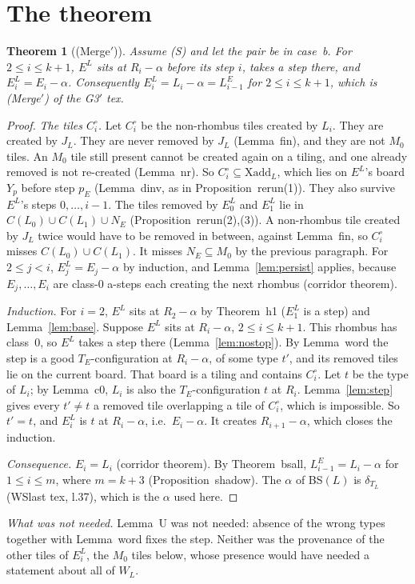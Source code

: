 \documentclass[11pt]{article}
\newtheorem{theorem}{Theorem}\newtheorem{lemma}[theorem]{Lemma}\newtheorem{proposition}[theorem]{Proposition}
\begin{document}
\section{The theorem}
\begin{theorem}[(Merge$'$)]\label{thm:mp}
Assume (S) and let the pair be in case~b. For $2\le i\le k+1$, $E^L$ sits at $R_i-\alpha$ before its step $i$, takes a step there, and $E^L_i=E_i-\alpha$. Consequently $E^L_i=L_i-\alpha=L^E_{i-1}$ for $2\le i\le k+1$, which is (Merge$'$) of the G3$'$ tex.
\end{theorem}
\begin{proof}
\emph{The tiles $C^\circ_i$.} Let $C^\circ_i$ be the non-rhombus tiles created by $L_i$. They are created by $J_L$. They are never removed by $J_L$ (Lemma~fin), and they are not $M_0$ tiles. An $M_0$ tile still present cannot be created again on a tiling, and one already removed is not re-created (Lemma~nr). So $C^\circ_i\subseteq\mathrm{Xadd}_L$, which lies on $E^L$'s board $Y_p$ before step $p_E$ (Lemma~dinv, as in Proposition~rerun(1)).
They also survive $E^L$'s steps $0,\dots,i-1$. The tiles removed by $E^L_0$ and $E^L_1$ lie in $C(L_0)\cup C(L_1)\cup N_E$ (Proposition~rerun(2),(3)). A non-rhombus tile created by $J_L$ twice would have to be removed in between, against Lemma~fin, so $C^\circ_i$ misses $C(L_0)\cup C(L_1)$. It misses $N_E\subseteq M_0$ by the previous paragraph. For $2\le j<i$, $E^L_j=E_j-\alpha$ by induction, and Lemma~\ref{lem:persist} applies, because $E_j,\dots,E_i$ are class-0 a-steps each creating the next rhombus (corridor theorem).

\emph{Induction.} For $i=2$, $E^L$ sits at $R_2-\alpha$ by Theorem~h1 ($E^L_1$ is a step) and Lemma~\ref{lem:base}. Suppose $E^L$ sits at $R_i-\alpha$, $2\le i\le k+1$. This rhombus has class~0, so $E^L$ takes a step there (Lemma~\ref{lem:nostop}). By Lemma~word the step is a good $T_E$-configuration at $R_i-\alpha$, of some type $t'$, and its removed tiles lie on the current board. That board is a tiling and contains $C^\circ_i$. Let $t$ be the type of $L_i$; by Lemma~c0, $L_i$ is also the $T_E$-configuration $t$ at $R_i$. Lemma~\ref{lem:step} gives every $t'\neq t$ a removed tile overlapping a tile of $C^\circ_i$, which is impossible. So $t'=t$, and $E^L_i$ is $t$ at $R_i-\alpha$, i.e.\ $E_i-\alpha$. It creates $R_{i+1}-\alpha$, which closes the induction.

\emph{Consequence.} $E_i=L_i$ (corridor theorem). By Theorem~bsall, $L^E_{i-1}=L_i-\alpha$ for $1\le i\le m$, where $m=k+3$ (Proposition~shadow). The $\alpha$ of BS$(L)$ is $\delta_{T_L}$ (WSlast tex, l.37), which is the $\alpha$ used here.
\end{proof}
\noindent\emph{What was not needed.} Lemma~U was not needed: absence of the wrong types together with Lemma~word fixes the step. Neither was the provenance of the other tiles of $E^L_i$, the $M_0$ tiles below, whose presence would have needed a statement about all of $W_L$.
\end{document}
